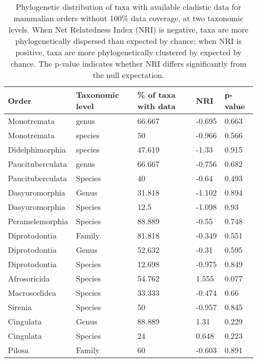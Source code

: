 
\begin{longtable}{lllll}
\caption{Phylogenetic distribution of taxa with available cladistic data for mammalian orders without 100\% data coverage, at two taxonomic levels. When Net Relatedness Index (NRI) is negative, taxa are more phylogenetically dispersed than expected by chance; when NRI is positive, taxa are more phylogenetically clustered by expected by chance. The p-value indicates whether NRI differs significantly from the null expectation.} \\ 
  \hline
Order & Taxonomic level & \% of taxa with data & NRI & p-value \\ 
  \hline
Monotremata & genus & 66.667 & -0.695 & 0.663 \\ 
  Monotremata & species & 50 & -0.966 & 0.566 \\ 
  Didelphimorphia & species & 47.619 & -1.33 & 0.915 \\ 
  Paucituberculata & genus & 66.667 & -0.756 & 0.682 \\ 
  Paucituberculata & Species & 40 & -0.64 & 0.493 \\ 
  Dasyuromorphia & Genus & 31.818 & -1.102 & 0.894 \\ 
  Dasyuromorphia & Species & 12.5 & -1.098 & 0.93 \\ 
  Peramelemorphia & Species & 88.889 & -0.55 & 0.748 \\ 
  Diprotodontia & Family & 81.818 & -0.349 & 0.551 \\ 
  Diprotodontia & Genus & 52.632 & -0.31 & 0.595 \\ 
  Diprotodontia & Species & 12.698 & -0.975 & 0.849 \\ 
  Afrosoricida & Species & 54.762 & 1.555 & 0.077 \\ 
  Macroscelidea & Species & 33.333 & -0.474 & 0.66 \\ 
  Sirenia & Species & 50 & -0.957 & 0.845 \\ 
  Cingulata & Genus & 88.889 & 1.31 & 0.229 \\ 
  Cingulata & Species & 24 & 0.648 & 0.223 \\ 
  Pilosa & Family & 60 & -0.603 & 0.891 \\ 

\end{longtable}

